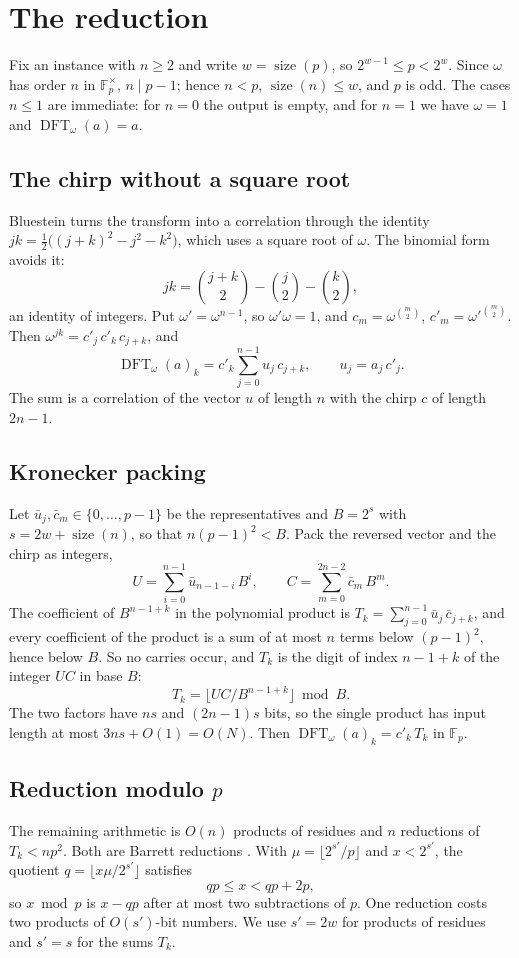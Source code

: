 \documentclass[11pt]{amsart}
\newcommand{\F}{\mathbb{F}}
\newcommand{\size}{\operatorname{size}}
\newcommand{\DFT}{\operatorname{DFT}}
\begin{document}
\section{The reduction}
\label{sec:reduction}

Fix an instance with $n \ge 2$ and write $w = \size(p)$, so $2^{w-1} \le p < 2^w$. Since
$\omega$ has order $n$ in $\F_p^\times$, $n \mid p - 1$; hence $n < p$, $\size(n) \le w$, and
$p$ is odd. The cases $n \le 1$ are immediate: for $n = 0$ the output is empty, and for $n = 1$
we have $\omega = 1$ and $\DFT_\omega(a) = a$.

\subsection{The chirp without a square root}
Bluestein \cite{Blu} turns the transform into a correlation through the identity
$jk = \tfrac{1}{2}\bigl((j+k)^2 - j^2 - k^2\bigr)$, which uses a square root of $\omega$. The
binomial form avoids it:
\[
  jk = \binom{j+k}{2} - \binom{j}{2} - \binom{k}{2},
\]
an identity of integers. Put $\omega' = \omega^{n-1}$, so $\omega'\omega = 1$, and
$c_m = \omega^{\binom{m}{2}}$, $c'_m = \omega'^{\binom{m}{2}}$. Then
$\omega^{jk} = c'_j\, c'_k\, c_{j+k}$, and
\[
  \DFT_\omega(a)_k = c'_k \sum_{j=0}^{n-1} u_j\, c_{j+k}, \qquad u_j = a_j\, c'_j .
\]
The sum is a correlation of the vector $u$ of length $n$ with the chirp $c$ of length
$2n - 1$.

\subsection{Kronecker packing}
Let $\bar u_j, \bar c_m \in \{0, \dots, p-1\}$ be the representatives and $B = 2^s$ with
$s = 2w + \size(n)$, so that $n (p-1)^2 < B$. Pack the reversed vector and the chirp as integers,
\[
  U = \sum_{i=0}^{n-1} \bar u_{n-1-i}\, B^i, \qquad C = \sum_{m=0}^{2n-2} \bar c_m\, B^m .
\]
The coefficient of $B^{n-1+k}$ in the polynomial product is
$T_k = \sum_{j=0}^{n-1} \bar u_j\, \bar c_{j+k}$, and every coefficient of the product is a sum
of at most $n$ terms below $(p-1)^2$, hence below $B$. So no carries occur, and $T_k$ is the
digit of index $n - 1 + k$ of the integer $UC$ in base $B$:
\[
  T_k = \bigl\lfloor UC / B^{n-1+k} \bigr\rfloor \bmod B .
\]
The two factors have $ns$ and $(2n-1)s$ bits, so the single product has input length at most
$3ns + O(1) = O(N)$. Then $\DFT_\omega(a)_k = c'_k\, T_k$ in $\F_p$.

\subsection{Reduction modulo \texorpdfstring{$p$}{p}}
The remaining arithmetic is $O(n)$ products of residues and $n$ reductions of $T_k < n p^2$.
Both are Barrett reductions \cite{Bar}. With $\mu = \lfloor 2^{s'}/p \rfloor$ and $x < 2^{s'}$,
the quotient $q = \lfloor x\mu / 2^{s'} \rfloor$ satisfies
\[
  qp \le x < qp + 2p ,
\]
so $x \bmod p$ is $x - qp$ after at most two subtractions of $p$. One reduction costs two
products of $O(s')$-bit numbers. We use $s' = 2w$ for products of residues and $s' = s$ for the
sums $T_k$.
\end{document}
